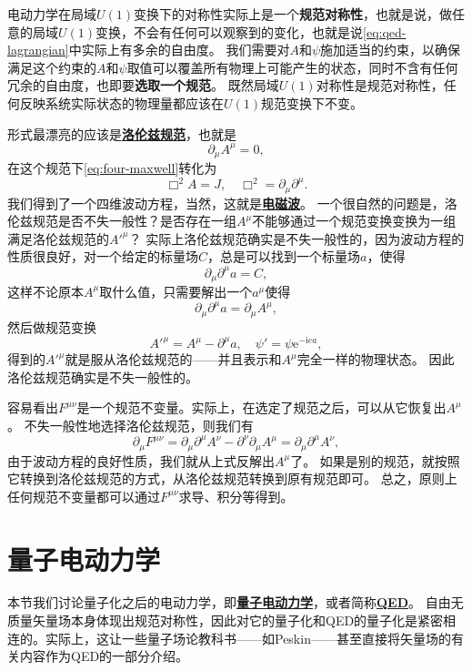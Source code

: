 \documentclass[hyperref, UTF8, a4paper]{ctexart}
\newcommand*{\ii}{\mathrm{i}}
\newcommand*{\ee}{\mathrm{e}}
\newcommand{\concept}[1]{\underline{\textbf{#1}}}
\renewcommand{\emph}{\textbf}
\begin{document}
电动力学在局域$U(1)$变换下的对称性实际上是一个\emph{规范对称性}，也就是说，做任意的局域$U(1)$变换，不会有任何可以观察到的变化，也就是说\eqref{eq:qed-lagrangian}中实际上有多余的自由度。
我们需要对$A$和$\psi$施加适当的约束，以确保满足这个约束的$A$和$\psi$取值可以覆盖所有物理上可能产生的状态，同时不含有任何冗余的自由度，也即要\emph{选取一个规范}。
既然局域$U(1)$对称性是规范对称性，任何反映系统实际状态的物理量都应该在$U(1)$规范变换下不变。

形式最漂亮的应该是\concept{洛伦兹规范}，也就是
\begin{equation}
    \partial_\mu A^\mu = 0,
\end{equation}
在这个规范下\eqref{eq:four-maxwell}转化为
\begin{equation}
    \Box^2 A = J, \quad \Box^2 = \partial_\mu \partial^\mu.
\end{equation}
我们得到了一个四维波动方程，当然，这就是\concept{电磁波}。
一个很自然的问题是，洛伦兹规范是否不失一般性？是否存在一组$A^\mu$不能够通过一个规范变换变换为一组满足洛伦兹规范的$A'^\mu$？
实际上洛伦兹规范确实是不失一般性的，因为波动方程的性质很良好，对一个给定的标量场$C$，总是可以找到一个标量场$a$，使得
\[
    \partial_\mu \partial^\mu a = C,
\]
这样不论原本$A^\mu$取什么值，只需要解出一个$a^\mu$使得
\[
    \partial_\mu \partial^\mu a = \partial_\mu A^\mu,
\]
然后做规范变换
\[
    A'^\mu = A^\mu - \partial^\mu a, \quad \psi' = \psi \ee^{-\ii e a},
\]
得到的$A'^\mu$就是服从洛伦兹规范的——并且表示和$A^\mu$完全一样的物理状态。
因此洛伦兹规范确实是不失一般性的。

容易看出$F^{\mu \nu}$是一个规范不变量。实际上，在选定了规范之后，可以从它恢复出$A^\mu$。
不失一般性地选择洛伦兹规范，则我们有
\[
    \partial_\mu F^{\mu \nu} = \partial_\mu \partial^\mu A^\nu - \partial^\nu \partial_\mu A^\mu = \partial_\mu \partial^\mu A^\nu,
\]
由于波动方程的良好性质，我们就从上式反解出$A^\mu$了。
如果是别的规范，就按照它转换到洛伦兹规范的方式，从洛伦兹规范转换到原有规范即可。
总之，原则上任何规范不变量都可以通过$F^{\mu \nu}$求导、积分等得到。

\section{量子电动力学}

本节我们讨论量子化之后的电动力学，即\concept{量子电动力学}，或者简称\concept{QED}。
自由无质量矢量场本身体现出规范对称性，因此对它的量子化和QED的量子化是紧密相连的。实际上，这让一些量子场论教科书——如Peskin——甚至直接将矢量场的有关内容作为QED的一部分介绍。
\end{document}
